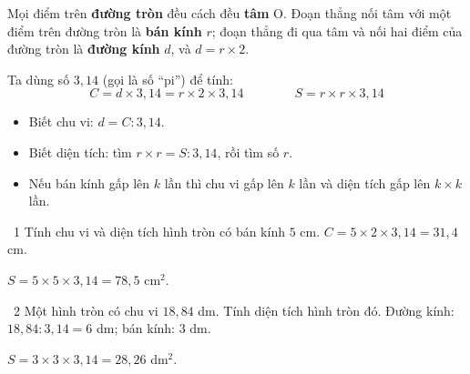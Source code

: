 \begin{knowbox}
\begin{minipage}[t]{0.64\linewidth}
Mọi điểm trên \textbf{đường tròn} đều cách đều \textbf{tâm} O. Đoạn thẳng nối tâm với một điểm trên đường tròn là \textbf{bán kính} $r$; đoạn thẳng đi qua tâm và nối hai điểm của đường tròn là \textbf{đường kính} $d$, và $d=r\times2$.\par
\smallskip
Ta dùng số $3{,}14$ (gọi là số ``pi'') để tính:
\[C=d\times3{,}14=r\times2\times3{,}14\qquad\qquad S=r\times r\times3{,}14\]
\begin{itemize}[leftmargin=1.4em,itemsep=2pt]
\item Biết chu vi: $d=C:3{,}14$.
\item Biết diện tích: tìm $r\times r=S:3{,}14$, rồi tìm số $r$.
\item Nếu bán kính gấp lên $k$ lần thì chu vi gấp lên $k$ lần và diện tích gấp lên $k\times k$ lần.
\end{itemize}
\end{minipage}\hfill
\begin{minipage}[t]{0.32\linewidth}\vspace{6pt}\centering
{}
\end{minipage}
\end{knowbox}
\gap
\begin{exbox}{\ExWord\ 1}
Tính chu vi và diện tích hình tròn có bán kính $5$ cm.
\guide
$C=5\times2\times3{,}14=31{,}4$ cm.\par $S=5\times5\times3{,}14=78{,}5$ cm$^2$.
\end{exbox}
\gap
\begin{exbox}{\ExWord\ 2}
Một hình tròn có chu vi $18{,}84$ dm. Tính diện tích hình tròn đó.
\guide
Đường kính: $18{,}84:3{,}14=6$ dm; bán kính: $3$ dm.\par $S=3\times3\times3{,}14=28{,}26$ dm$^2$.
\end{exbox}
\gap
